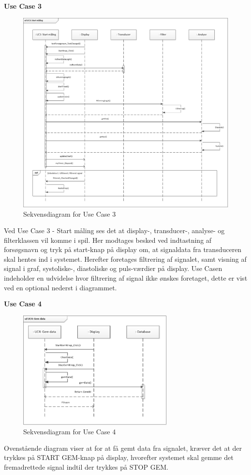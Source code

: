 \textbf{Use Case 3}
\begin{figure}[H]
	\centering
	\includegraphics[width=1.0\textwidth]{Figurer/UC3}
	\caption{Sekvensdiagram for Use Case 3}
\end{figure}
Ved Use Case 3 - Start måling ses det at display-, transducer-, analyse- og filterklassen vil komme i spil. Her modtages besked ved indtastning af forsøgsnavn og tryk på start-knap på display om, at signaldata fra transduceren skal hentes ind i systemet. Herefter foretages filtrering af signalet, samt visning af signal i graf, systoliske-, diastoliske og puls-værdier på display. Use Casen indeholder en udvidelse hvor filtrering af signal ikke ønskes foretaget, dette er vist ved en optional nederst i diagrammet. 

\textbf{Use Case 4}
\begin{figure}[H]
	\centering
	\includegraphics[width=0.7\textwidth]{Figurer/UC4}
	\caption{Sekvensdiagram for Use Case 4}
\end{figure}
Ovenstående diagram viser at for at få gemt data fra signalet, kræver det at der trykkes på START GEM-knap på display, hvorefter systemet skal gemme det fremadrettede signal indtil der trykkes på STOP GEM.

